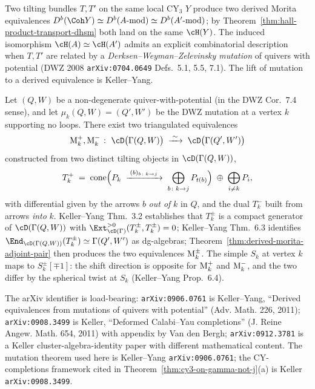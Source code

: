 Two tilting bundles $T, T'$ on the same local CY$_3$ $Y$ produce two derived Morita equivalences $D^{b}(\Coh Y) \simeq D^{b}(A\text{-}\mathrm{mod}) \simeq D^{b}(A'\text{-}\mathrm{mod})$; by Theorem~\ref{thm:hall-product-transport-dhsm} both land on the same $\cH(Y)$. The induced isomorphism $\cH(A) \simeq \cH(A')$ admits an explicit combinatorial description when $T, T'$ are related by a \emph{Derksen--Weyman--Zelevinsky mutation} of quivers with potential (DWZ 2008 \texttt{arXiv:0704.0649} Defs.~5.1, 5.5, 7.1). The lift of mutation to a derived equivalence is Keller--Yang.

\begin{theorem}
\label{thm:keller-yang-mutation-derived}
Let $(Q, W)$ be a non-degenerate quiver-with-potential (in the DWZ Cor.~7.4 sense), and let $\mu_k (Q, W) = (Q', W')$ be the DWZ mutation at a vertex $k$ supporting no loops. There exist two triangulated equivalences
\[
 \Mu_k^{+}, \Mu_k^{-} \;\colon\; \cD\bigl(\Gamma(Q, W)\bigr)
 \;\xrightarrow{\;\sim\;}\;
 \cD\bigl(\Gamma(Q', W')\bigr)
\]
constructed from two distinct tilting objects in $\cD(\Gamma(Q, W))$,
\[
 T_k^{+} \;=\; \mathrm{cone}\Bigl(P_k \;\xrightarrow{\;(b)_{b\colon k \to j}\;}\; \bigoplus_{b \colon k \to j} P_{t(b)}\Bigr) \;\oplus\; \bigoplus_{i \neq k} P_i,
\]
with differential given by the arrows $b$ \emph{out of} $k$ in $Q$, and the dual $T_k^{-}$ built from arrows \emph{into} $k$. Keller--Yang Thm.~3.2 establishes that $T_k^{\pm}$ is a compact generator of $\cD(\Gamma(Q, W))$ with $\Ext^{>0}_{\cD(\Gamma)}(T_k^{\pm}, T_k^{\pm}) = 0$; Keller--Yang Thm.~6.3 identifies $\End_{\cD(\Gamma(Q, W))}(T_k^{\pm}) \simeq \Gamma(Q', W')$ as dg-algebras; Theorem~\ref{thm:derived-morita-adjoint-pair} then produces the two equivalences $\mathrm{M}_k^{\pm}$. The simple $S_k$ at vertex $k$ maps to $S_k^{\pm}[\mp 1]$: the shift direction is opposite for $\mathrm{M}_k^{+}$ and $\mathrm{M}_k^{-}$, and the two differ by the spherical twist at $S_k$ (Keller--Yang Prop.~6.4).
\end{theorem}

The arXiv identifier is load-bearing: \texttt{arXiv:0906.0761} is Keller--Yang, ``Derived equivalences from mutations of quivers with potential'' (Adv. Math. 226, 2011); \texttt{arXiv:0908.3499} is Keller, ``Deformed Calabi--Yau completions'' (J. Reine Angew. Math. 654, 2011) with appendix by Van den Bergh; \texttt{arXiv:0912.3781} is a Keller cluster-algebra-identity paper with different mathematical content. The mutation theorem used here is Keller--Yang \texttt{arXiv:0906.0761}; the CY-completions framework cited in Theorem~\ref{thm:cy3-on-gamma-not-j}(a) is Keller \texttt{arXiv:0908.3499}.

